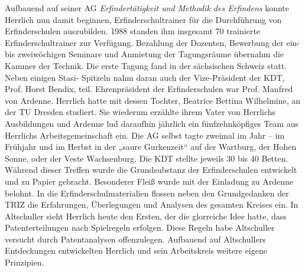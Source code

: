 \documentclass[11pt,a4paper]{article}
\begin{document}
Aufbauend auf seiner AG \emph{Erfindertätigkeit und Methodik des Erfindens}
konnte Herrlich nun damit beginnen, Erfinderschultrainer für die Durchführung
von Erfinderschulen auszubilden. 1988 standen ihm insgesamt 70 trainierte
Erfinderschultrainer zur Verfügung. Bezahlung der Dozenten, Bewerbung der ein-
bis zweiwöchigen Seminare und Anmietung der Tagungsräume übernahm die Kammer
der Technik. Die erste Tagung fand in der sächsischen Schweiz statt. Neben
einigen Stasi- Spitzeln nahm daran auch der Vize-Präsident der KDT,
Prof. Horst Bendix, teil.  Ehrenpräsident der Erfinderschulen war
Prof. Manfred von Ardenne. Herrlich hatte mit dessen Tochter, Beatrice Bettina
Wilhelmine, an der TU Dresden studiert. Sie wiederum erzählte ihrem Vater von
Herrlichs Ausbildungen und Ardenne lud daraufhin jährlich ein fünfzehnköpfiges
Team aus Herrlichs Arbeitsgemeinschaft ein. Die AG selbst tagte zweimal im
Jahr – im Frühjahr und im Herbst in der „saure Gurkenzeit“ auf der Wartburg,
der Hohen Sonne, oder der Veste Wachsenburg. Die KDT stellte jeweils 30 bis 40
Betten.  Während dieser Treffen wurde die Grundsubstanz der Erfinderschulen
entwickelt und zu Papier gebracht. Besonderer Fleiß wurde mit der Einladung zu
Ardenne belohnt. In die Erfinderschulmaterialien flossen neben den
Grundgedanken der TRIZ die Erfahrungen, Überlegungen und Analysen des gesamten
Kreises ein. In Altschuller sieht Herrlich heute den Ersten, der die
glorreiche Idee hatte, dass Patenterteilungen nach Spielregeln erfolgen. Diese
Regeln habe Altschuller versucht durch Patentanalysen offenzulegen.  Aufbauend
auf Altschullers Entdeckungen entwickelten Herrlich und sein Arbeitskreis
weitere eigene Prinzipien.
\end{document}
